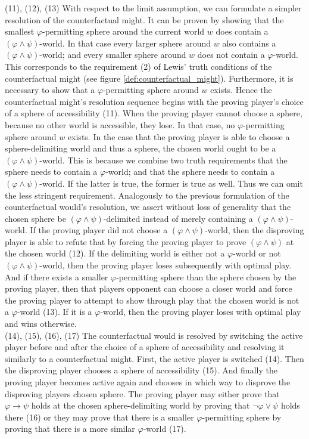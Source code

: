\documentclass[a4paper,american,10pt]{paper}
\theoremstyle{definition}\newtheorem{definition}{Definition}
\begin{document}
\indent (11), (12), (13) With respect to the limit assumption, we can formulate a simpler resolution of the counterfactual might. It can be proven by showing that the smallest $\varphi$-permitting sphere around the current world $w$ does contain a $(\varphi\wedge\psi )$-world. In that case every larger sphere around $w$ also contains a $(\varphi\wedge\psi )$-world; and every smaller sphere around $w$ does not contain a $\varphi$-world. This corresponds to the requirement (2) of Lewis' truth conditions of the counterfactual might (see figure \ref{def:counterfactual_might}). Furthermore, it is necessary to show that a $\varphi$-permitting sphere around $w$ exists. Hence the counterfactual might's resolution sequence begins with the proving player's choice of a sphere of accessibility (11). When the proving player cannot choose a sphere, because no other world is accessible, they lose. In that case, no $\varphi$-permitting sphere around $w$ exists. In the case that the proving player is able to choose a sphere-delimiting world and thus a sphere, the chosen world ought to be a $(\varphi\wedge\psi )$-world. This is because we combine two truth requirements that the sphere needs to contain a $\varphi$-world; and that the sphere needs to contain a $(\varphi\wedge\psi )$-world. If the latter is true, the former is true as well. Thus we can omit the less stringent requirement. Analogously to the previous formulation of the counterfactual would's resolution, we assert without loss of generality that the chosen sphere be $(\varphi\wedge\psi )$-delimited instead of merely containing a $(\varphi\wedge\psi )$-world. If the proving player did not choose a $(\varphi\wedge\psi )$-world, then the disproving player is able to refute that by forcing the proving player to prove $(\varphi\wedge\psi )$ at the chosen world (12). If the delimiting world is either not a $\varphi$-world or not $(\varphi\wedge\psi )$-world, then the proving player loses subsequently with optimal play. And if there exists a smaller $\varphi$-permitting sphere than the sphere chosen by the proving player, then that players opponent can choose a closer world and force the proving player to attempt to show through play that the chosen world is not a $\varphi$-world (13). If it is a $\varphi$-world, then the proving player loses with optimal play and wins otherwise.\\
\indent (14), (15), (16), (17) The counterfactual would is resolved by switching the active player before and after the choice of a sphere of accessibility and resolving it similarly to a counterfactual might. First, the active player is switched (14). Then the disproving player chooses a sphere of accessibility (15). And finally the proving player becomes active again and chooses in which way to disprove the disproving players chosen sphere. The proving player may either prove that $\varphi\rightarrow\psi$ holds at the chosen sphere-delimiting world by proving that $\neg\varphi\vee\psi$ holds there (16) or they may prove that there is a smaller $\varphi$-permitting sphere by proving that there is a more similar $\varphi$-world (17).
\end{document}
